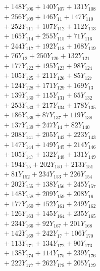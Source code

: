 \documentclass[a4paper,10pt]{article}
\begin{document}
{\begin{align}
&\quad  + 148Y_{106} + 140Y_{107} + 131Y_{108} \\[0.5ex]
&\quad  + 256Y_{109} + 146Y_{11} + 147Y_{110} \\[0.5ex]
&\quad  + 252Y_{111} + 107Y_{112} + 112Y_{113} \\[0.5ex]
&\quad  + 165Y_{114} + 255Y_{115} + 71Y_{116} \\[0.5ex]
&\quad  + 244Y_{117} + 192Y_{118} + 168Y_{119} \\[0.5ex]
&\quad  + 76Y_{12} + 250Y_{120} + 132Y_{121} \\[0.5ex]
&\quad  + 177Y_{122} + 195Y_{123} + 98Y_{124} \\[0.5ex]
&\quad  + 105Y_{125} + 211Y_{126} + 85Y_{127} \\[0.5ex]
&\quad  + 124Y_{128} + 171Y_{129} + 169Y_{13} \\[0.5ex]
&\quad  + 139Y_{130} + 115Y_{131} + 65Y_{132} \\[0.5ex]
&\quad  + 253Y_{133} + 217Y_{134} + 178Y_{135} \\[0.5ex]
&\quad  + 186Y_{136} + 87Y_{137} + 119Y_{138} \\[0.5ex]
&\quad  + 137Y_{139} + 247Y_{14} + 82Y_{140} \\[0.5ex]
&\quad  + 208Y_{141} + 205Y_{142} + 223Y_{143} \\[0.5ex]
&\quad  + 147Y_{144} + 149Y_{145} + 214Y_{146} \\[0.5ex]
&\quad  + 105Y_{147} + 132Y_{148} + 131Y_{149} \\[0.5ex]
&\quad  + 194Y_{15} + 202Y_{150} + 213Y_{151} \\[0.5ex]
&\quad  + 81Y_{152} + 234Y_{153} + 226Y_{154} \\[0.5ex]
&\quad  + 202Y_{155} + 138Y_{156} + 245Y_{157} \\[0.5ex]
&\quad  + 148Y_{158} + 209Y_{159} + 208Y_{16} \\[0.5ex]
&\quad  + 177Y_{160} + 152Y_{161} + 249Y_{162} \\[0.5ex]
&\quad  + 126Y_{163} + 145Y_{164} + 235Y_{165} \\[0.5ex]
&\quad  + 234Y_{166} + 92Y_{167} + 201Y_{168} \\[0.5ex]
&\quad  + 142Y_{169} + 242Y_{17} + 106Y_{170} \\[0.5ex]
&\quad  + 113Y_{171} + 134Y_{172} + 90Y_{173} \\[0.5ex]
&\quad  + 138Y_{174} + 114Y_{175} + 239Y_{176} \\[0.5ex]
&\quad  + 222Y_{177} + 262Y_{178} + 205Y_{179} \\[0.5ex]

\end{align}}
\end{document}
